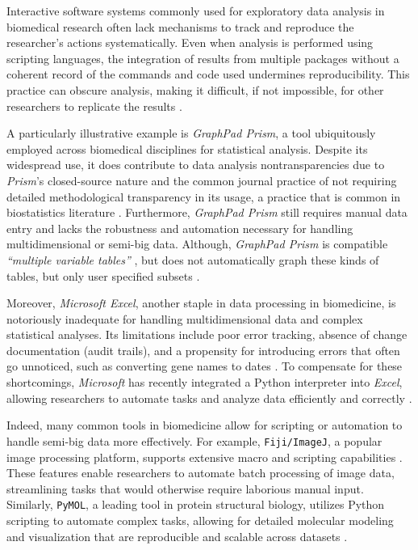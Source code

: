 %
\label{sec:intro_nontransparent_tools}%
Interactive software systems commonly used for exploratory data analysis in
biomedical research often lack mechanisms to track and reproduce the
researcher's actions systematically. Even when analysis is performed using
scripting languages, the integration of results from multiple packages without a
coherent record of the commands and code used undermines reproducibility. This
practice can obscure analysis, making it difficult, if not impossible, for other
researchers to replicate the results \cite{leekStatisticsValuesAre2015,
    pengReproducibleResearchComputational2011,
    mesirovAccessibleReproducibleResearch2010, localioStatisticalCodeSupport2018}.

A particularly illustrative example is \textit{GraphPad Prism}, a tool
ubiquitously employed across biomedical disciplines for statistical analysis.
Despite its widespread use, it does contribute to data analysis
nontransparencies due to \textit{Prism}'s closed-source nature and the common
journal practice of not requiring detailed methodological transparency in its
usage, a practice that is common in biostatistics literature
\cite{gosselinInsufficientTransparencyStatistical2021,
    localioStatisticalCodeSupport2018}. Furthermore, \textit{GraphPad Prism} still
requires manual data entry and lacks the robustness and automation necessary for
handling multidimensional or semi-big data. Although, \textit{GraphPad Prism} is
compatible \textit{``multiple variable tables''} , but does not
automatically graph these kinds of tables, but only user specified subsets
\cite{GraphPadPrism102024}.

Moreover, \textit{Microsoft Excel}, another staple in data processing in
biomedicine, is notoriously inadequate for handling multidimensional data and
complex statistical analyses. Its limitations include poor error tracking,
absence of change documentation (audit trails), and a propensity for introducing
errors that often go unnoticed, such as converting gene names to dates
\cite{ziemannGeneNameErrors2016}. To compensate for these shortcomings,
\textit{Microsoft} has recently integrated a Python interpreter into
\textit{Excel}, allowing researchers to automate tasks and analyze data
efficiently and correctly \cite{microsoftexcelAnnouncingPythonExcel2023}.

Indeed, many common tools in biomedicine allow for scripting or automation to
handle semi-big data more effectively. For example, \texttt{Fiji/ImageJ}, a
popular image processing platform, supports extensive macro and scripting
capabilities \cite{ruedenImageJ2ImageJNext2017}. These features enable researchers to automate batch processing of
image data, streamlining tasks that would otherwise require laborious manual
input. Similarly, \texttt{PyMOL}, a leading tool in protein structural biology,
utilizes Python scripting to automate complex tasks, allowing for detailed
molecular modeling and visualization that are reproducible and scalable across
datasets \cite{PyMOL, rigsbyUsingPyMOLApplication2016}.

